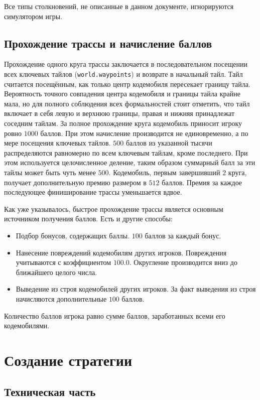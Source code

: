 Все типы столкновений, не описанные в данном документе, игнорируются симулятором игры.

\section{Прохождение трассы и начисление баллов}

Прохождение одного круга трассы заключается в последовательном посещении всех ключевых тайлов (\texttt{world.waypoints}) и возврате в
начальный тайл. Тайл считается посещённым, как только центр кодемобиля пересекает границу тайла. Вероятность точного совпадения центра
кодемобиля и границы тайла крайне мала, но для полного соблюдения всех формальностей стоит отметить, что тайл включает в себя левую и
верхнюю границы, правая и нижняя принадлежат соседним тайлам. За полное прохождение круга кодемобиль приносит игроку ровно $1000$ баллов.
При этом начисление производится не единовременно, а по мере посещения ключевых тайлов. $500$ баллов из указанной тысячи распределяются
равномерно по всем ключевым тайлам, кроме последнего. При этом используется целочисленное деление, таким образом суммарный балл за эти тайлы
может быть чуть менее $500$. Кодемобиль, первым завершивший $2$ круга, получает дополнительную премию размером в $512$ баллов. Премия за
каждое последующее финиширование трассы уменьшается вдвое.

Как уже указывалось, быстрое прохождение трассы является основным источником получения баллов. Есть и другие способы:
\begin{itemize}
  \item Подбор бонусов, содержащих баллы. $100$ баллов за каждый бонус.
  \item Нанесение повреждений кодемобилям других игроков. Повреждения учитываются с коэффициентом $100.0$. Округление производится вниз до
        ближайшего целого числа.
  \item Выведение из строя кодемобилей других игроков. За факт выведения из строя начисляются дополнительные $100$ баллов.
\end{itemize}

Количество баллов игрока равно сумме баллов, заработанных всеми его кодемобилями.

\chapter{Создание стратегии}

\section{Техническая часть}

